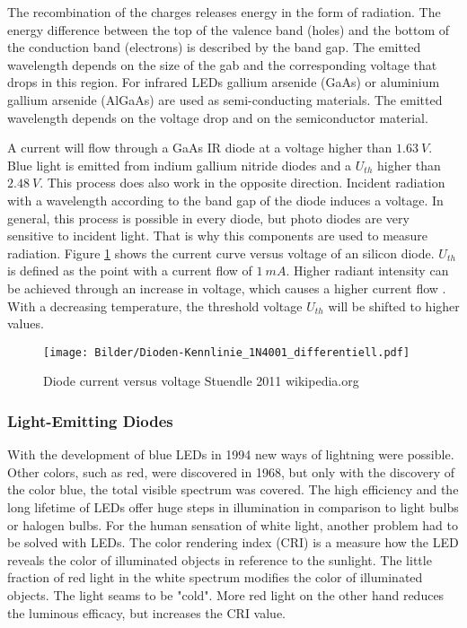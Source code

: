 The recombination of the charges releases energy in the form of radiation. The energy difference between the top of the valence band (holes) and the bottom of the conduction band (electrons) is described by the band gap. The emitted wavelength depends on the size of the gab and the corresponding voltage that drops in this region. For infrared LEDs gallium arsenide (GaAs) or aluminium gallium arsenide (AlGaAs) are used as semi-conducting materials. The emitted wavelength depends on the voltage drop and on the semiconductor material.

A current will flow through a GaAs IR diode at a voltage higher than $1.63~V$. Blue light is emitted from indium gallium nitride diodes and a $U_{th}$ higher than $2.48~V$. This process does also work in the opposite direction. Incident radiation with a wavelength according to the band gap of the diode induces a voltage. In general, this process is possible in every diode, but photo diodes are very sensitive to incident light. That is why this components are used to measure radiation. Figure \ref{fig:thresholdvoltage} shows the current curve versus voltage of an silicon diode. $U_{th}$ is defined as the point with a current flow of $1~mA$. Higher radiant intensity can be achieved through an increase in voltage, which causes a higher current flow \cite{tschirleyelektronik}. With a decreasing temperature, the threshold voltage $U_{th}$ will be shifted to higher values.\\


\begin{figure} [!h]
	\centering
	\texttt{[image: Bilder/Dioden-Kennlinie\_1N4001\_differentiell.pdf]}
	\caption{Diode current versus voltage \tiny Stuendle 2011 wikipedia.org}
	\label{fig:thresholdvoltage}
\end{figure}

\subsubsection{Light-Emitting Diodes}

With the development of blue LEDs in 1994 new ways of lightning were possible. Other colors, such as red, were discovered in 1968, but only with the discovery of the color blue, the total visible spectrum was covered. The high efficiency and the long lifetime of LEDs offer huge steps in illumination in comparison to light bulbs or halogen bulbs. For the human sensation of white light, another problem had to be solved with LEDs. The color rendering index (CRI) is a measure how the LED reveals the color of illuminated objects in reference to the sunlight. The little fraction of red light in the white spectrum modifies the color of illuminated objects. The light seams to be "cold". More red light on the other hand reduces the luminous efficacy, but increases the CRI value.\\

